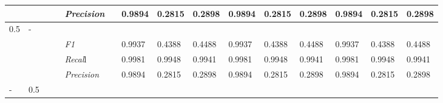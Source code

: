 \begin{table}[]
\begin{tabularx}{\textwidth}{XXlllllllllllll@{}}
                                                                    &                                                                     &                                                           &    & \textit{Precision} &                                                      & 0.9894 & 0.2815 & 0.2898 & 0.9894 & 0.2815 & 0.2898 & 0.9894 & 0.2815 & 0.2898 \\ \midrule
0.5 & - &  &  &                                                              &                                                                   &                                                             &                                                               &                                                                    &                                                              &                                                               &                                                                    &                                                              \\
                                                                    &                                                                     &                                                           &    & \textit{F1} &                                                      & 0.9937        & 0.4388        & 0.4488        & 0.9937        & 0.4388        & 0.4488        & 0.9937        & 0.4388        & 0.4488        \\
                                                                    &                                                                     &                                                           &    & \textit{Recal}l &                                                      & 0.9981    & 0.9948    & 0.9941    & 0.9981    & 0.9948    & 0.9941    & 0.9981    & 0.9948    & 0.9941    \\
                                                                    &                                                                     &                                                           &    & \textit{Precision} &                                                      & 0.9894 & 0.2815 & 0.2898 & 0.9894 & 0.2815 & 0.2898 & 0.9894 & 0.2815 & 0.2898 \\ \midrule
- & 0.5 &  &  &                                                              &                                                                   &                                                             &                                                               &                                                                    &                                                              &                                                               &                                                                    &                                                              \\

\end{tabularx}
\end{table}
